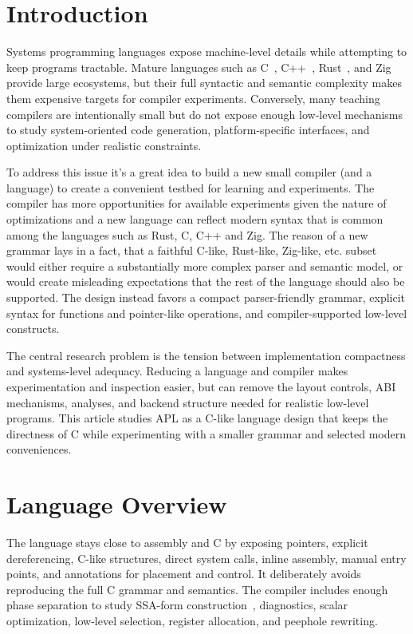 \documentclass[10pt,twocolumn]{article}
\begin{document}
\section{Introduction}
\par Systems programming languages expose machine-level details while attempting to keep programs tractable. Mature languages such as C~\cite{ritchie1978c,kernighan1988c}, C++~\cite{stroustrup2007cpp,stroustrup2013cpp}, Rust~\cite{klabnik2023rust,jung2018rustbelt}, and Zig~\cite{ziglangref} provide large ecosystems, but their full syntactic and semantic complexity makes them expensive targets for compiler experiments. Conversely, many teaching compilers are intentionally small but do not expose enough low-level mechanisms to study system-oriented code generation, platform-specific interfaces, and optimization under realistic constraints.
\par To address this issue it's a great idea to build a new small compiler (and a language) to create a convenient testbed for learning and experiments. The compiler has more opportunities for available experiments given the nature of optimizations and a new language can reflect modern syntax that is common among the languages such as Rust, C, C++ and Zig. The reason of a new grammar lays in a fact, that a faithful C-like, Rust-like, Zig-like, etc. subset would either require a substantially more complex parser and semantic model, or would create misleading expectations that the rest of the language should also be supported. The design instead favors a compact parser-friendly grammar, explicit syntax for functions and pointer-like operations, and compiler-supported low-level constructs.
\par The central research problem is the tension between implementation compactness and systems-level adequacy. Reducing a language and compiler makes experimentation and inspection easier, but can remove the layout controls, ABI mechanisms, analyses, and backend structure needed for realistic low-level programs. This article studies APL as a C-like language design that keeps the directness of C while experimenting with a smaller grammar and selected modern conveniences.

\section{Language Overview}
\par The language stays close to assembly and C by exposing pointers, explicit dereferencing, C-like structures, direct system calls, inline assembly, manual entry points, and annotations for placement and control. It deliberately avoids reproducing the full C grammar and semantics. The compiler includes enough phase separation to study SSA-form construction~\cite{cytron1991ssa}, diagnostics, scalar optimization, low-level selection, register allocation, and peephole rewriting.
\end{document}
